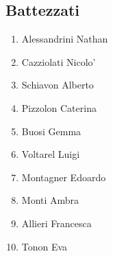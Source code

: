\clearpage
\subsection{Battezzati}
\begin{multicols}{2}
\begin{enumerate}
  \item Alessandrini Nathan
  \item Cazziolati Nicolo'
  \item Schiavon Alberto
  \item Pizzolon Caterina
  \item Buosi Gemma
  \item Voltarel Luigi
  \item Montagner Edoardo
  \item Monti Ambra
  \item Allieri Francesca
  \item Tonon Eva
\end{enumerate}
\end{multicols}

